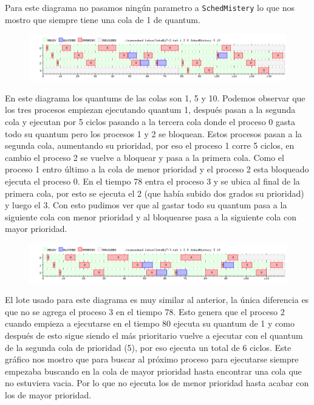 Para este diagrama no pasamos ningún parametro a \texttt{SchedMistery} lo que nos mostro que siempre tiene una cola de 1 de quantum. 

\begin{figure}[H]
  \centering
  \includegraphics[width=1\textwidth]{img/imgEj7-2}
  \caption{}
  \label{fig:ej7-2}
\end{figure}

En este diagrama los quantums de las colas son 1, 5 y 10. Podemos observar que los tres procesos empiezan ejecutando quantum 1, después pasan a la segunda cola y ejecutan por 5 ciclos pasando a la tercera cola donde el proceso 0 gasta todo su quantum pero los procesos 1 y 2 se bloquean. Estos procesos pasan a la segunda cola, aumentando su prioridad, por eso el proceso 1 corre 5 ciclos, en cambio el proceso 2  se vuelve a bloquear y pasa a la primera cola. Como el proceso 1 entro último a la cola de menor prioridad y el proceso 2 esta bloqueado ejecuta el proceso 0. En el tiempo 78 entra el proceso 3 y se ubica al final de la primera cola, por esto se ejecuta el 2 (que había subido dos grados su prioridad) y luego el 3. Con esto pudimos ver que al gastar todo su quantum pasa a la siguiente cola con menor prioridad y al bloquearse  pasa a la siguiente cola con mayor prioridad.

\begin{figure}[H]
  \centering
  \includegraphics[width=1\textwidth]{img/imgEj7-3}
  \caption{}
  \label{fig:ej7-3}
\end{figure}

El lote usado para este diagrama es muy similar al anterior, la única diferencia es que no se agrega el proceso 3 en el tiempo 78. Esto genera que el proceso 2 cuando empieza a ejecutarse en el tiempo 80 ejecuta su quantum de 1 y como después de esto sigue siendo el más prioritario vuelve a ejecutar con el quantum de la segunda cola de prioridad (5), por eso ejecuta un total de 6 ciclos. Este gráfico nos mostro que para buscar al próximo proceso para ejecutarse siempre empezaba buscando en la cola de mayor prioridad hasta encontrar una cola que no estuviera vacia. Por lo que no ejecuta los de menor prioridad hasta acabar con los de mayor prioridad.